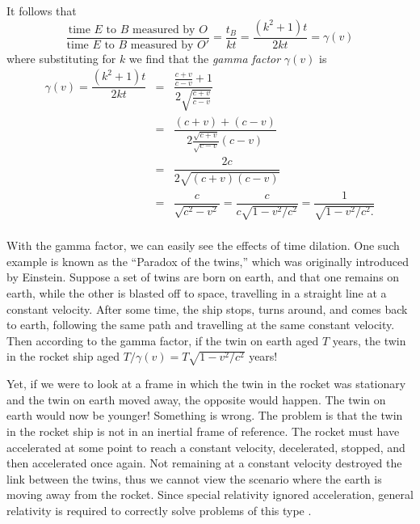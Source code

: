 \documentclass[12pt]{article}
\theoremstyle{defn}
\theoremstyle{pf}
\newcommand{\0}{\emptyset}
\renewcommand{\-}{\setminus}
\begin{document}
It follows that $$\dfrac{\mbox{time $E$ to $B$ measured by $O$}}{\mbox{time $E$ to $B$ measured by $O'$}}=\dfrac{t_B}{kt}=\dfrac{(k^2+1)t}{2kt}=\gamma(v)$$ where substituting for $k$ we find that the \textit{gamma factor} $\gamma(v)$ is
\begin{eqnarray*}
\gamma(v)=\dfrac{(k^2+1)t}{2kt}&=&\dfrac{\frac{c+v}{c-v}+1}{2\sqrt{\frac{c+v}{c-v}}}\\
&=&\dfrac{(c+v)+(c-v)}{2\frac{\sqrt{c+v}}{\sqrt{c-v}}(c-v)}\\
&=&\dfrac{2c}{2\sqrt{(c+v)(c-v)}}\\
&=&\dfrac{c}{\sqrt{c^2-v^2}}=\dfrac{c}{c\sqrt{1-v^2/c^2}}=\dfrac{1}{\sqrt{1-v^2/c^2.}}\\
\end{eqnarray*}

With the gamma factor, we can easily see the effects of time dilation. One such example is known as the ``Paradox of the twins,'' which was originally introduced by Einstein. Suppose a set of twins are born on earth, and that one remains on earth, while the other is blasted off to space, travelling in a straight line at a constant velocity. After some time, the ship stops, turns around, and comes back to earth, following the same path and travelling at the same constant velocity. Then according to the gamma factor, if the twin on earth aged $T$ years, the twin in the rocket ship aged $T/\gamma(v)=T\sqrt{1-v^2/c^2}$ years!

Yet, if we were to look at a frame in which the twin in the rocket was stationary and the twin on earth moved away, the opposite would happen. The twin on earth would now be younger! Something is wrong. The problem is that the twin in the rocket ship is not in an inertial frame of reference. The rocket must have accelerated at some point to reach a constant velocity, decelerated, stopped, and then accelerated once again. Not remaining at a constant velocity destroyed the link between the twins, thus we cannot view the scenario where the earth is moving away from the rocket. Since special relativity ignored acceleration, general relativity is required to correctly solve problems of this type \cite{shadowitz}.
\end{document}
